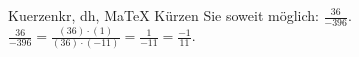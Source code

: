 \begin{MAufgabe}{Kuerzen}{kr, dh, MaTeX}
K\"urzen Sie soweit m\"oglich: $\frac{36}{-396}$.\\ 
\ifLsg\MLoesung
\quad $\frac{36}{-396}=\frac{(36)\cdot(1)}{(36)\cdot(-11)}=\frac{1}{-11}=\frac{-1}{11}$.\else\relax\fi
 \end{MAufgabe}